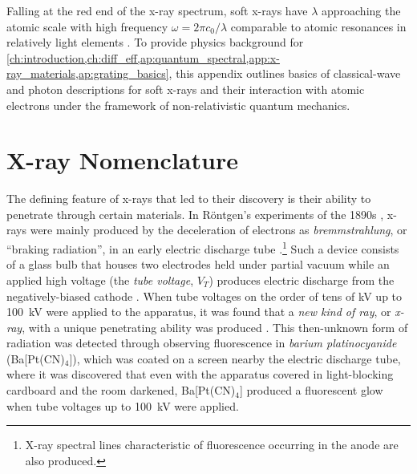 Falling at the red end of the x-ray spectrum, soft x-rays have $\lambda$ approaching the atomic scale with high frequency $\omega = 2 \pi c_0 / \lambda$ comparable to atomic resonances in relatively light elements \cite{Attwood17}. 
To provide physics background for \cref{ch:introduction,ch:diff_eff,ap:quantum_spectral,app:x-ray_materials,ap:grating_basics}, this appendix outlines basics of classical-wave and photon descriptions for soft x-rays and their interaction with atomic electrons under the framework of non-relativistic quantum mechanics. 

\section{X-ray Nomenclature}\label{sec:histroical}
The defining feature of x-rays that led to their discovery is their ability to penetrate through certain materials.
In R\"ontgen's experiments of the 1890s \cite{Rontgen1898a,Rontgen1898b,Rontgen1896}, x-rays were mainly produced by the deceleration of electrons as \emph{bremmstrahlung}, or ``braking radiation'', in an early electric discharge tube \cite{Compton35,Rybicki86,Attwood17,Als-Nielsen11}.\footnote{X-ray spectral lines characteristic of fluorescence occurring in the anode are also produced.} 
Such a device consists of a glass bulb that houses two electrodes held under partial vacuum while an applied high voltage (the \emph{tube voltage}, $V_T$) produces electric discharge from the negatively-biased cathode \cite{Coolidge1913,Compton35,Als-Nielsen11}. 
When tube voltages on the order of tens of \si{\kilo\volt} up to \SI{100}{\kilo\volt} were applied to the apparatus, it was found that a \emph{new kind of ray}, or \emph{x-ray}, with a unique penetrating ability was produced \cite{Rontgen1898a,Rontgen1896}. 
This then-unknown form of radiation was detected through observing fluorescence in \emph{barium platinocyanide} (Ba[Pt(CN)$_4$]), which was coated on a screen nearby the electric discharge tube, where it was discovered that even with the apparatus covered in light-blocking cardboard and the room darkened, Ba[Pt(CN)$_4$] produced a fluorescent glow when tube voltages up to \SI{100}{\kilo\volt} were applied. 

